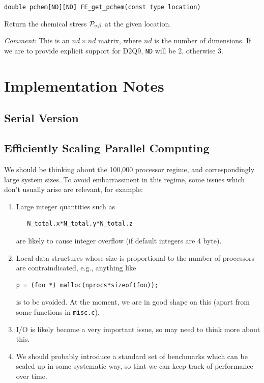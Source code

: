 \texttt{double pchem[ND][ND] FE\_get\_pchem(const type location)}

Return the chemical stress ${\cal P}_{\alpha\beta}$ at the
given location.

\textit{Comment:} This is an $nd \times nd$ matrix, where $nd$ is
the number of dimensions. If we are to provide explicit support for
D2Q9, \texttt{ND} will be 2, otherwise 3.


\clearpage
\vfill\pagebreak


\section{Implementation Notes}

\subsection{Serial Version}

\subsection{Efficiently Scaling Parallel Computing}

We should be thinking about the 100,000 processor regime, and
correspondingly large system sizes. To avoid embarrassment in this regime,
some issues which don't usually arise are relevant, for example:

\begin{enumerate}
\item
Large integer quantities such as
\begin{verbatim}
   N_total.x*N_total.y*N_total.z
\end{verbatim}
are likely to cause integer overflow (if default integers are 4 byte).
\item
Local data structures whose size is proportional
to the number of processors are contraindicated, e.g.,
anything like
\begin{verbatim}
p = (foo *) malloc(nprocs*sizeof(foo));
\end{verbatim}
is to be avoided. At the moment, we are in good shape on this
(apart from some functions in \texttt{misc.c}).
\item
I/O is likely become a very important issue, so may need to think
more about this.
\item
We should probably introduce a standard set of benchmarks which can
be scaled up in some systematic way, so that we can keep track of
performance over time.

\end{enumerate}


